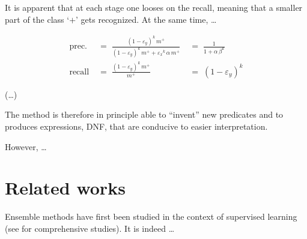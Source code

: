 \documentclass[twocolumn,english]{article}
\begin{document}
It is apparent that at each stage one looses on the recall, meaning that a smaller part of the class `$+$' gets recognized. At the same time, \ldots

\begin{align*}
   \text{prec.} \; &= \; \frac{(1 - \varepsilon_y)^k \, m^+}{(1 - \varepsilon_y)^k \, m^+ + {\varepsilon_x}^k \, \alpha \, m^+} 
   \; &= \;  \frac{1}{1 + \alpha \, \beta^k } \\
   \text{recall} \; &= \;  \frac{(1-\varepsilon_y)^k \, m^+}{m^+} \; &= \; (1 - \varepsilon_y)^k
\end{align*}

(\ldots)


The method is therefore in principle able to ``invent'' new predicates and to produces expressions, DNF, that are conducive to easier interpretation.

However, \ldots 



\section{Related works}

Ensemble methods have first been studied in the context of supervised learning 
(see \cite{schapire2012boosting,zhou2012ensemble} for comprehensive studies). It is indeed \ldots




\end{document}
